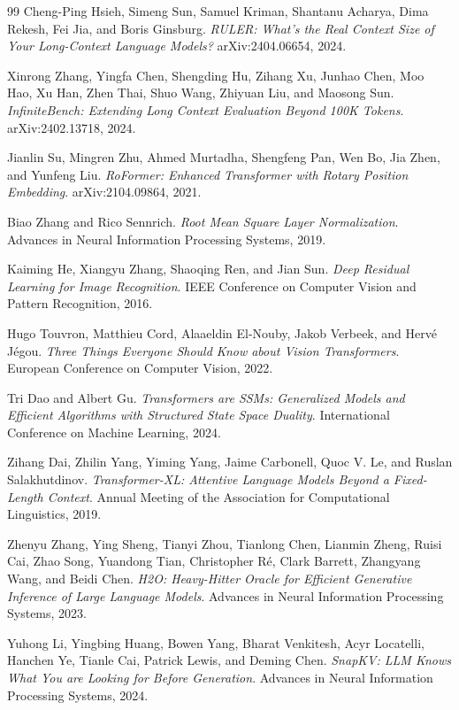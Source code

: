 \documentclass[preprint,12pt]{elsarticle}
\begin{document}
\begin{thebibliography}{99}
Cheng-Ping Hsieh, Simeng Sun, Samuel Kriman, Shantanu Acharya, Dima Rekesh, Fei Jia, and Boris Ginsburg.
\textit{RULER: What's the Real Context Size of Your Long-Context Language Models?}
arXiv:2404.06654, 2024.

Xinrong Zhang, Yingfa Chen, Shengding Hu, Zihang Xu, Junhao Chen, Moo Hao, Xu Han, Zhen Thai, Shuo Wang, Zhiyuan Liu, and Maosong Sun.
\textit{InfiniteBench: Extending Long Context Evaluation Beyond 100K Tokens}.
arXiv:2402.13718, 2024.

Jianlin Su, Mingren Zhu, Ahmed Murtadha, Shengfeng Pan, Wen Bo, Jia Zhen, and Yunfeng Liu.
\textit{RoFormer: Enhanced Transformer with Rotary Position Embedding}.
arXiv:2104.09864, 2021.

Biao Zhang and Rico Sennrich.
\textit{Root Mean Square Layer Normalization}.
Advances in Neural Information Processing Systems, 2019.

Kaiming He, Xiangyu Zhang, Shaoqing Ren, and Jian Sun.
\textit{Deep Residual Learning for Image Recognition}.
IEEE Conference on Computer Vision and Pattern Recognition, 2016.

Hugo Touvron, Matthieu Cord, Alaaeldin El-Nouby, Jakob Verbeek, and Herv\'{e} J\'{e}gou.
\textit{Three Things Everyone Should Know about Vision Transformers}.
European Conference on Computer Vision, 2022.

Tri Dao and Albert Gu.
\textit{Transformers are SSMs: Generalized Models and Efficient Algorithms with Structured State Space Duality}.
International Conference on Machine Learning, 2024.

Zihang Dai, Zhilin Yang, Yiming Yang, Jaime Carbonell, Quoc V. Le, and Ruslan Salakhutdinov.
\textit{Transformer-XL: Attentive Language Models Beyond a Fixed-Length Context}.
Annual Meeting of the Association for Computational Linguistics, 2019.

Zhenyu Zhang, Ying Sheng, Tianyi Zhou, Tianlong Chen, Lianmin Zheng, Ruisi Cai, Zhao Song, Yuandong Tian, Christopher R\'{e}, Clark Barrett, Zhangyang Wang, and Beidi Chen.
\textit{H2O: Heavy-Hitter Oracle for Efficient Generative Inference of Large Language Models}.
Advances in Neural Information Processing Systems, 2023.

Yuhong Li, Yingbing Huang, Bowen Yang, Bharat Venkitesh, Acyr Locatelli, Hanchen Ye, Tianle Cai, Patrick Lewis, and Deming Chen.
\textit{SnapKV: LLM Knows What You are Looking for Before Generation}.
Advances in Neural Information Processing Systems, 2024.


\end{thebibliography}
\end{document}
